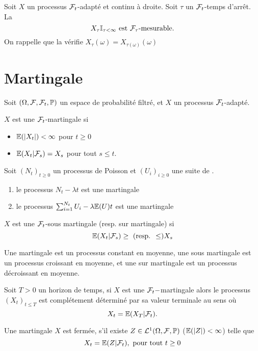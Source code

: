 \begin{prop}
Soit $X$ un processus $\mathcal{F}_t$-adapté et continu à droite. Soit $\tau$ un $\mathcal{F}_t$-temps d'arrêt. La \va
$$
X_\tau\mathbb{I}_{\tau<\infty}\text{ est }\mathcal{F}_\tau\text{-mesurable}.
$$
On rappelle que la \va vérifie $X_\tau(\omega) = X_{\tau(\omega)}(\omega)$
\end{prop}
\section{Martingale}\label{sec:temps_arret_contd}
Soit $(\Omega,\mathcal{F}, \mathcal{F}_t,\mathbb{P})$ un espace de probabilité filtré, et $X$ un processus $\mathcal{F}_t$-adapté.
\begin{definition}\label{def:martingale_contd}
$X$ est une $\mathcal{F}_t$-martingale si 
\begin{itemize}
    \item $\mathbb{E}(|X_t|)<\infty$ pour $t\geq 0$
    \item $\mathbb{E}(X_t|\mathcal{F}_s) = X_s$ pour tout $s\leq t$.
\end{itemize}
\end{definition}
\begin{ex}
Soit $(N_t)_{t\geq 0}$ un processus de Poisson et $(U_i)_{i\geq 0}$ une suite de \va \iid.
\begin{enumerate}
    \item le processus $N_t-\lambda t$ est une martingale
    \item le processus $\sum_{i = 1}^{N_t}U_i-\lambda\mathbb{E}(U) t$ est une martingale
\end{enumerate}
\end{ex}
\begin{definition}
$X$ est une $\mathcal{F}_t$-sous martingale (resp. sur martingale) si 
$$
 \mathbb{E}(X_t|\mathcal{F}_s) \geq\text{ (resp. }\leq) X_s
$$
\end{definition}
Une martingale est un processus constant en moyenne, une sous martingale est un processus croissant en moyenne, et une sur martingale est un processus décroissant en moyenne.
\begin{prop}
Soit $T> 0$ un horizon de temps, si $X$ est une $\mathcal{F}_t-$martingale alors le processus $(X_t)_{t\leq T}$ est complétement déterminé par sa valeur terminale au sens où 
$$
X_t = \mathbb{E}(X_T|\mathcal{F}_t).
$$
\end{prop}
\begin{definition}\label{def:closed_martingale}
Une martingale $X$ est fermée, s'il existe $Z\in\mathcal{L}^1
(\Omega,\mathcal{F}, \mathbb{P})$ ($\mathbb{E}(|Z|)<\infty$) telle que 
$$
X_t  =\mathbb{E}(Z|\mathcal{F}_t),\text{ pour tout }t\geq 0
$$

\end{definition}
